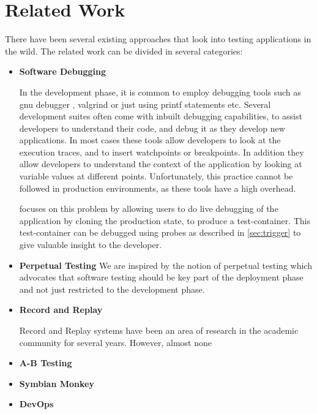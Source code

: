 
\section{Related Work}
\label{sec:related}

There have been several existing approaches that look into testing applications in the wild. 
The related work can be divided in several categories:

\begin{itemize}
  
  \item \textbf{Software Debugging}
  
  In the development phase, it is common to employ debugging tools such as gnu debugger \cite{gdb}, valgrind \cite{valgrind} or just using printf statements etc.
  Several development suites\cite{eclipse, visual_studio, intel_suite} often come with inbuilt debugging capabilities, to assist developers to understand their code, and debug it as they develop new applications.
  In most cases these tools allow developers to look at the execution traces, and to insert watchpoints or breakpoints.
  In addition they allow developers to understand the context of the application by looking at variable values at different points.
  Unfortunately, this practice cannot be followed in production environments, as these tools have a high overhead.
  
  \parikshan focuses on this problem by allowing users to do live debugging of the application by cloning the production state, to produce a test-container.
  This test-container can be debugged using probes as described in \ref{sec:trigger} to give valuable insight to the developer.
  
    
  \item \textbf{Perpetual Testing}
     We are inspired by the notion of perpetual testing\cite{perpetual} which advocates that software testing should be key part of the deployment phase and not just restricted to the development phase.
  
  \item \textbf{Record and Replay}
  
  Record and Replay systems have been an area of research in the academic community for several years.
  However, almost none  
  
  \cite{altekar2009odr,dunlap2002revirt,guo2008r2, geels2007friday, laadan2010transparent}
  
  \item \textbf{A-B Testing}
  \item \textbf{Symbian Monkey}
   \item \textbf{DevOps}
\end{itemize}
  

